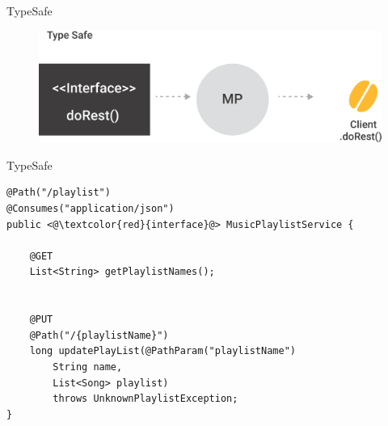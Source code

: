 \documentclass[aspectratio=169]{beamer}
\begin{document}
\begin{frame}{TypeSafe}
\begin{figure}
	\centering
	\includegraphics[width=0.75\linewidth]{Images/typesafe}
\end{figure}
\end{frame}

\begin{frame}[fragile]{TypeSafe}


\begin{lstlisting}
@Path("/playlist")
@Consumes("application/json")
public <@\textcolor{red}{interface}@> MusicPlaylistService {

	@GET
	List<String> getPlaylistNames();


	@PUT
	@Path("/{playlistName}")
	long updatePlayList(@PathParam("playlistName")
		String name,
		List<Song> playlist)
		throws UnknownPlaylistException;
}
\end{lstlisting}
\end{frame}
\end{document}
